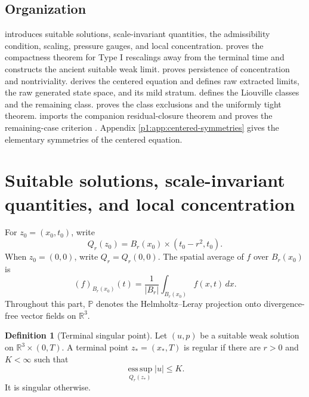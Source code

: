 \documentclass[11pt]{amsart}
\theoremstyle{plain}
\theoremstyle{definition}
\newtheorem{definition}[definition]{Definition}
\theoremstyle{remark}
\numberwithin{equation}{section}
\newcommand{\R}{\mathbb R}
\newcommand{\esssup}{\operatorname*{ess\,sup}}
\begin{document}
\subsection{Organization}

 introduces suitable solutions, scale-invariant quantities,
the admissibility condition, scaling, pressure gauges, and local concentration.
 proves the compactness theorem for Type I
rescalings away from the terminal time and constructs the ancient suitable
weak limit.   proves persistence of concentration and
nontriviality.   derives the centered equation and defines
raw extracted limits, the raw generated state space, and its mild stratum.
 defines the
Liouville classes and the remaining class.   proves the
class exclusions and the uniformly tight theorem.  
imports the companion residual-closure theorem and proves the remaining-case
criterion .
Appendix \ref{p1:app:centered-symmetries} gives
the elementary symmetries of the centered equation.

\section{Suitable solutions, scale-invariant quantities, and local concentration}
\label{p1:sec:prelim}

For \(z_0=(x_0,t_0)\), write
\[
   Q_r(z_0)=B_r(x_0)\times(t_0-r^2,t_0).
\]
When \(z_0=(0,0)\), write \(Q_r=Q_r(0,0)\).  The spatial average of \(f\) over
\(B_r(x_0)\) is
\[
   (f)_{B_r(x_0)}(t)=\frac1{|B_r|}\int_{B_r(x_0)}f(x,t)\,dx.
\]
Throughout this part, \(\mathbb P\) denotes the Helmholtz--Leray projection
onto divergence-free vector fields on \(\R^3\).

\begin{definition}[Terminal singular point]\label{p1:def:terminal-singular}
Let \((u,p)\) be a suitable weak solution on \(\R^3\times(0,T)\).  A terminal
point \(z_*=(x_*,T)\) is regular if there are \(r>0\) and \(K<\infty\) such
that
\[
   \esssup_{Q_r(z_*)}|u|\le K.
\]
It is singular otherwise.
\end{definition}
\end{document}
